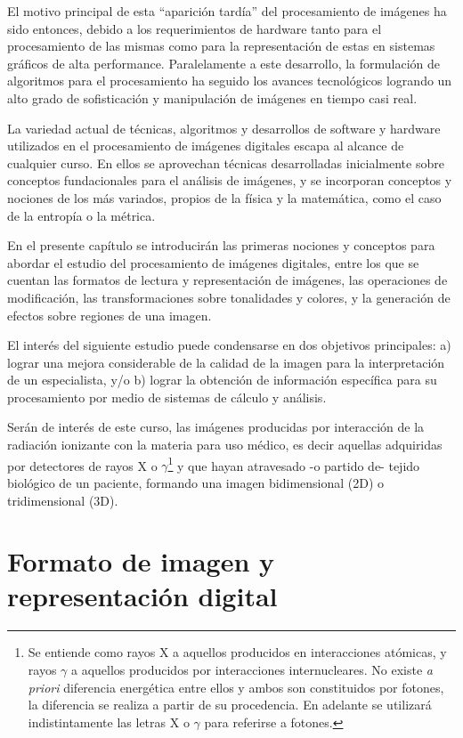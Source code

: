 El motivo principal de esta ``aparición tardía'' del procesamiento de imágenes ha sido entonces, debido a los requerimientos de hardware tanto para el procesamiento de las mismas como para la representación de estas en sistemas gráficos de alta performance. Paralelamente a este desarrollo, la formulación de algoritmos para el procesamiento ha seguido los avances tecnológicos logrando un alto grado de sofisticación y manipulación de imágenes en tiempo casi real.

La variedad actual de técnicas, algoritmos y desarrollos de software y hardware utilizados en el procesamiento de imágenes digitales escapa al alcance de cualquier curso. En ellos se aprovechan técnicas desarrolladas inicialmente sobre conceptos fundacionales para el análisis de imágenes, y se incorporan conceptos y nociones de los más variados, propios de la física y la matemática, como el caso de la entropía o la métrica.

En el presente capítulo se introducirán las primeras nociones y conceptos para abordar el estudio del procesamiento de imágenes digitales, entre los que se cuentan las formatos de lectura y representación de imágenes, las operaciones de modificación, las transformaciones sobre tonalidades y colores, y la generación de efectos sobre regiones de una imagen.

El interés del siguiente estudio puede condensarse en dos objetivos principales: a) lograr una mejora considerable de la calidad de la imagen para la interpretación de un especialista, y/o b) lograr la obtención de información específica para su procesamiento por medio de sistemas de cálculo y análisis.

Serán de interés de este curso, las imágenes producidas por interacción de la radiación ionizante con la materia para uso médico, es decir aquellas adquiridas por detectores de rayos X o $\gamma$\footnote{Se entiende como rayos X a aquellos producidos en interacciones atómicas, y rayos $\gamma$ a aquellos producidos por interacciones internucleares. No existe \emph{a priori} diferencia energética entre ellos y ambos son constituidos por fotones, la diferencia se realiza a partir de su procedencia. En adelante se utilizará indistintamente las letras X o $\gamma$ para referirse a fotones.} y que hayan atravesado -o partido de- tejido biológico de un paciente, formando una imagen bidimensional (2D) o tridimensional (3D).


\section{Formato de imagen y representación digital}

